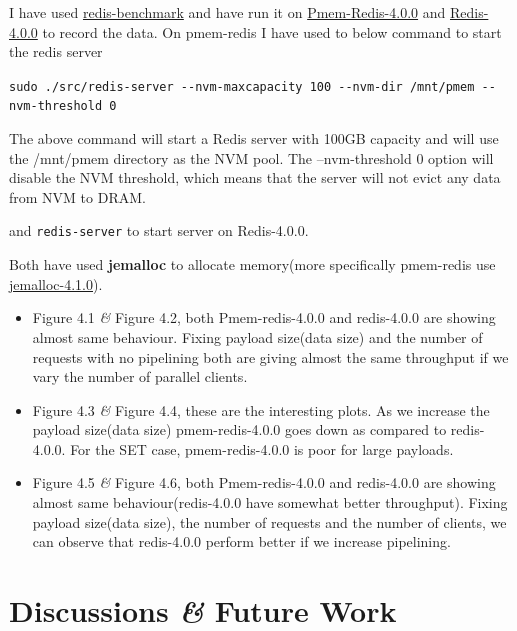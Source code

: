 \documentclass[11pt,swedish, openany, oneside]{book}
\begin{document}
I have used \href{https://redis.io/docs/management/optimization/benchmarks/#:~:text=The%20redis%2Dbenchmark%20program%20is,a%20Redis%20instance%20can%20sustain.}{redis-benchmark} and have run it on \href{https://github.com/pmem/pmem-redis}{Pmem-Redis-4.0.0} and \href{https://github.com/redis/redis/tree/4.0}{Redis-4.0.0} to record the data. On pmem-redis I have used to below command to start the redis server

\verb|sudo ./src/redis-server --nvm-maxcapacity 100 --nvm-dir /mnt/pmem --nvm-threshold 0|

The above command will start a Redis server with 100GB capacity and will use the /mnt/pmem directory as the NVM pool. The --nvm-threshold 0 option will disable the NVM threshold, which means that the server will not evict any data from NVM to DRAM.

and \verb|redis-server| to start server on Redis-4.0.0.

Both have used \textbf{jemalloc} to allocate memory(more specifically pmem-redis use \href{https://github.com/jemalloc/jemalloc/releases/tag/4.1.0}{jemalloc-4.1.0}). 

\begin{itemize}
    \item Figure 4.1 \textit{\&} Figure 4.2, both Pmem-redis-4.0.0 and redis-4.0.0 are showing almost same behaviour. Fixing payload size(data size) and the number of requests with no pipelining both are giving almost the same throughput if we vary the number of parallel clients.

    \item Figure 4.3 \textit{\&} Figure 4.4, these are the interesting plots. As we increase the payload size(data size) pmem-redis-4.0.0 goes down as compared to redis-4.0.0. For the SET case, pmem-redis-4.0.0 is poor for large payloads.
    
    \item Figure 4.5 \textit{\&} Figure 4.6, both Pmem-redis-4.0.0 and redis-4.0.0 are showing almost same behaviour(redis-4.0.0 have somewhat better throughput). Fixing payload size(data size), the number of requests and the number of clients, we can observe that redis-4.0.0 perform better if we increase pipelining.
    
\end{itemize}

\newpage

{\let\clearpage\relax\chapter{Discussions \textit{\&} Future Work}}
\vspace{1em}
\end{document}
